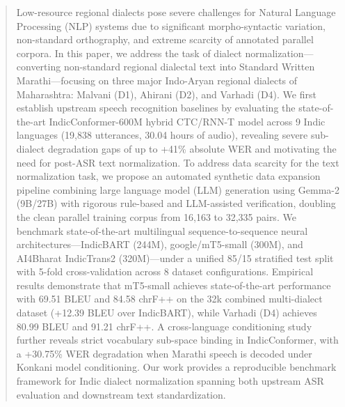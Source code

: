 
\color{blue}

\begin{abstract}
Low-resource regional dialects pose severe challenges for Natural Language Processing (NLP) systems due to significant morpho-syntactic variation, non-standard orthography, and extreme scarcity of annotated parallel corpora. In this paper, we address the task of dialect normalization---converting non-standard regional dialectal text into Standard Written Marathi---focusing on three major Indo-Aryan regional dialects of Maharashtra: Malvani (D1), Ahirani (D2), and Varhadi (D4). We first establish upstream speech recognition baselines by evaluating the state-of-the-art IndicConformer-600M hybrid CTC/RNN-T model across 9 Indic languages (19,838 utterances, 30.04 hours of audio), revealing severe sub-dialect degradation gaps of up to +41\% absolute WER and motivating the need for post-ASR text normalization. To address data scarcity for the text normalization task, we propose an automated synthetic data expansion pipeline combining large language model (LLM) generation using Gemma-2 (9B/27B) with rigorous rule-based and LLM-assisted verification, doubling the clean parallel training corpus from 16,163 to 32,335 pairs. We benchmark state-of-the-art multilingual sequence-to-sequence neural architectures---IndicBART (244M), google/mT5-small (300M), and AI4Bharat IndicTrans2 (320M)---under a unified 85/15 stratified test split with 5-fold cross-validation across 8 dataset configurations. Empirical results demonstrate that mT5-small achieves state-of-the-art performance with 69.51 BLEU and 84.58 chrF++ on the 32k combined multi-dialect dataset (+12.39 BLEU over IndicBART), while Varhadi (D4) achieves 80.99 BLEU and 91.21 chrF++. A cross-language conditioning study further reveals strict vocabulary sub-space binding in IndicConformer, with a +30.75\% WER degradation when Marathi speech is decoded under Konkani model conditioning. Our work provides a reproducible benchmark framework for Indic dialect normalization spanning both upstream ASR evaluation and downstream text standardization.

\end{abstract}

